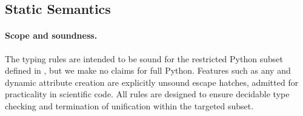 \subsection{Static Semantics}
\label{subsec:static-semantics}

\paragraph{Scope and soundness.}
The typing rules are intended to be sound for the restricted Python subset
defined in , but we make no claims for full Python.
Features such as \textsf{any} and dynamic attribute creation are explicitly
unsound escape hatches, admitted for practicality in scientific code.  
All rules are designed to ensure decidable type checking and termination of unification within the targeted subset.

